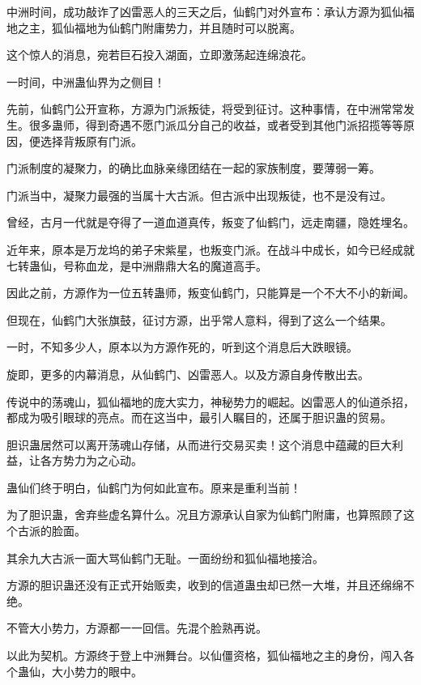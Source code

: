 
\begin{this_body}

中洲时间，成功敲诈了凶雷恶人的三天之后，仙鹤门对外宣布：承认方源为狐仙福地之主，狐仙福地为仙鹤门附庸势力，并且随时可以脱离。

这个惊人的消息，宛若巨石投入湖面，立即激荡起连绵浪花。

一时间，中洲蛊仙界为之侧目！

先前，仙鹤门公开宣称，方源为门派叛徒，将受到征讨。这种事情，在中洲常常发生。很多蛊师，得到奇遇不愿门派瓜分自己的收益，或者受到其他门派招揽等等原因，便选择背叛原有门派。

门派制度的凝聚力，的确比血脉亲缘团结在一起的家族制度，要薄弱一筹。

门派当中，凝聚力最强的当属十大古派。但古派中出现叛徒，也不是没有过。

曾经，古月一代就是夺得了一道血道真传，叛变了仙鹤门，远走南疆，隐姓埋名。

近年来，原本是万龙坞的弟子宋紫星，也叛变门派。在战斗中成长，如今已经成就七转蛊仙，号称血龙，是中洲鼎鼎大名的魔道高手。

因此之前，方源作为一位五转蛊师，叛变仙鹤门，只能算是一个不大不小的新闻。

但现在，仙鹤门大张旗鼓，征讨方源，出乎常人意料，得到了这么一个结果。

一时，不知多少人，原本以为方源作死的，听到这个消息后大跌眼镜。

旋即，更多的内幕消息，从仙鹤门、凶雷恶人。以及方源自身传散出去。

传说中的荡魂山，狐仙福地的庞大实力，神秘势力的崛起。凶雷恶人的仙道杀招，都成为吸引眼球的亮点。而在这当中，最引人瞩目的，还属于胆识蛊的贸易。

胆识蛊居然可以离开荡魂山存储，从而进行交易买卖！这个消息中蕴藏的巨大利益，让各方势力为之心动。

蛊仙们终于明白，仙鹤门为何如此宣布。原来是重利当前！

为了胆识蛊，舍弃些虚名算什么。况且方源承认自家为仙鹤门附庸，也算照顾了这个古派的脸面。

其余九大古派一面大骂仙鹤门无耻。一面纷纷和狐仙福地接洽。

方源的胆识蛊还没有正式开始贩卖，收到的信道蛊虫却已然一大堆，并且还绵绵不绝。

不管大小势力，方源都一一回信。先混个脸熟再说。

以此为契机。方源终于登上中洲舞台。以仙僵资格，狐仙福地之主的身份，闯入各个蛊仙，大小势力的眼中。


\end{this_body}
